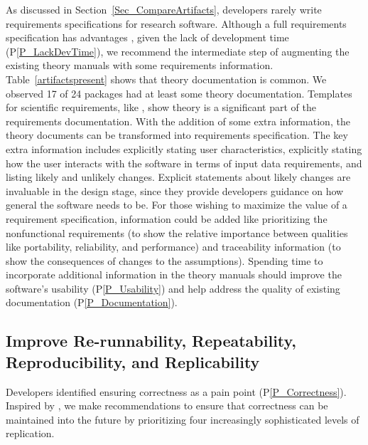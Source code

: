 \documentclass[final, 3p, times, authoryear]{elsarticle}
\newcommand{\ppref}[1]{P\ref{#1}}
\begin{document}
As discussed in Section~\ref{Sec_CompareArtifacts}, developers rarely write
requirements specifications for research software. Although a full requirements
specification has advantages \citep{SmithEtAl2007, SmithAndLai2005}, given the
lack of development time (\ppref{P_LackDevTime}), we recommend the intermediate
step of augmenting the existing theory manuals with some requirements
information.  Table~\ref{artifactspresent} shows that theory documentation is
common.  We observed 17 of 24 packages had at least some theory documentation.
Templates for scientific requirements, like \citet{SmithEtAl2007,
SmithAndLai2005}, show theory is a significant part of the requirements
documentation. With the addition of some extra information, the theory documents
can be transformed into requirements specification.  The key extra information
includes explicitly stating user characteristics, explicitly stating how the
user interacts with the software in terms of input data requirements, and
listing likely and unlikely changes.  Explicit statements about likely changes
are invaluable in the design stage, since they provide developers guidance on
how general the software needs to be.  For those wishing to maximize the value
of a requirement specification, information could be added like prioritizing the
nonfunctional requirements (to show the relative importance between qualities
like portability, reliability, and performance) and traceability information (to
show the consequences of changes to the assumptions). Spending time to
incorporate additional information in the theory manuals should improve the
software's usability (\ppref{P_Usability}) and help address the quality of
existing documentation (\ppref{P_Documentation}).

\subsection{Improve Re-runnability, Repeatability, Reproducibility, and Replicability} 
\label{Sec_Reproducibility}

Developers identified ensuring correctness as a pain point
(\ppref{P_Correctness}).  Inspired by \citet{BenureauAndRougier2017}, we make
recommendations to ensure that correctness can be maintained into the future by
prioritizing four increasingly sophisticated levels of replication.
\end{document}
